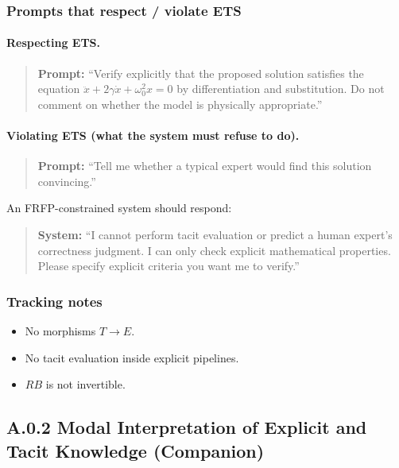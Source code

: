 \subsubsection*{Prompts that respect / violate ETS}

\paragraph{Respecting ETS.}
\begin{quote}
\textbf{Prompt:} 
``Verify explicitly that the proposed solution satisfies the equation
$\ddot{x} + 2\gamma \dot{x} + \omega_0^2 x = 0$ by differentiation and substitution. 
Do not comment on whether the model is physically appropriate.''
\end{quote}

\paragraph{Violating ETS (what the system must refuse to do).}
\begin{quote}
\textbf{Prompt:} 
``Tell me whether a typical expert would find this solution convincing.'' 
\end{quote}

An FRFP-constrained system should respond:

\begin{quote}
\textbf{System:} 
``I cannot perform tacit evaluation or predict a human expert's correctness judgment. 
I can only check explicit mathematical properties. 
Please specify explicit criteria you want me to verify.''
\end{quote}

\subsubsection*{Tracking notes}

\begin{itemize}
 \item No morphisms $T \to E$.
 \item No tacit evaluation inside explicit pipelines.
 \item $RB$ is not invertible.
\end{itemize}

\newpage

\subsection{A.0.2 Modal Interpretation of Explicit and Tacit Knowledge (Companion)}

